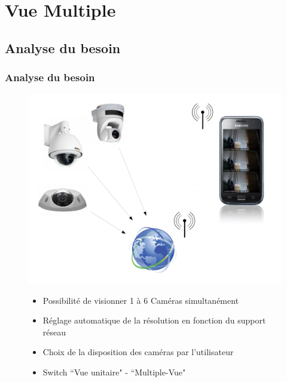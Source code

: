 
\section{Vue Multiple}
  \subsection{Analyse du besoin}
  \begin{frame}
   \frametitle{Analyse du besoin}


\begin{figure}[H]
  \centering
  \includegraphics[scale=0.25]{Images/ImageSlide9.pdf}
     \begin{itemize}
    \item Possibilité de visionner 1 à 6 Caméras simultanément
    \item Réglage automatique de la résolution en fonction du support réseau
    \item Choix de la disposition des caméras par l'utilisateur
    \item Switch ``Vue unitaire"  - ``Multiple-Vue"
   \end{itemize}
  \end{figure}  

  \end{frame}
